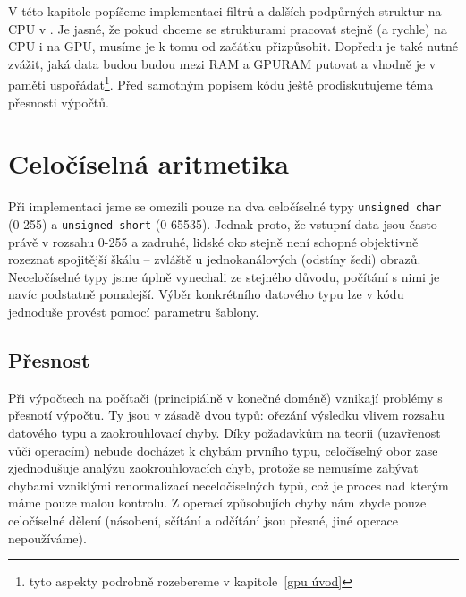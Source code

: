 

V této kapitole popíšeme implementaci filtrů a dalších podpůrných struktur na CPU v \Cpp. Je jasné, že pokud chceme se strukturami pracovat stejně (a rychle) na CPU i na GPU, musíme je k tomu od začátku přizpůsobit. Dopředu je také nutné zvážit, jaká data budou budou mezi RAM a GPURAM putovat a vhodně je v paměti uspořádat\footnote{tyto aspekty podrobně rozebereme v kapitole~\ref{gpu úvod}}. Před samotným popisem kódu ještě prodiskutujeme téma přesnosti výpočtů.

    \section{Celočíselná aritmetika}

    Při implementaci jsme se omezili pouze na dva celočíselné typy {\tt unsigned char} (0-255) a {\tt unsigned short} (0-65535). Jednak proto, že vstupní data jsou často právě v rozsahu 0-255 a zadruhé, lidské oko stejně není schopné objektivně rozeznat spojitější škálu -- zvláště u jednokanálových (odstíny šedi) obrazů. Neceločíselné typy jsme úplně vynechali ze stejného důvodu, počítání s nimi je navíc podstatně pomalejší. Výběr konkrétního datového typu lze v kódu jednoduše provést pomocí parametru šablony.

        \subsection{Přesnost}

        Při výpočtech na počítači (principiálně v konečné doméně) vznikají problémy s přesnotí výpočtu. Ty jsou v zásadě dvou typů: ořezání výsledku vlivem rozsahu datového typu a zaokrouhlovací chyby. Díky požadavkům na teorii (uzavřenost vůči operacím) nebude docházet k chybám prvního typu, celočíselný obor zase zjednodušuje analýzu zaokrouhlovacích chyb, protože se nemusíme zabývat chybami vzniklými renormalizací neceločíselných typů, což je proces nad kterým máme pouze malou kontrolu. Z operací způsobujích chyby nám zbyde pouze celočíselné dělení (násobení, sčítání a odčítání jsou přesné, jiné operace nepoužíváme).

